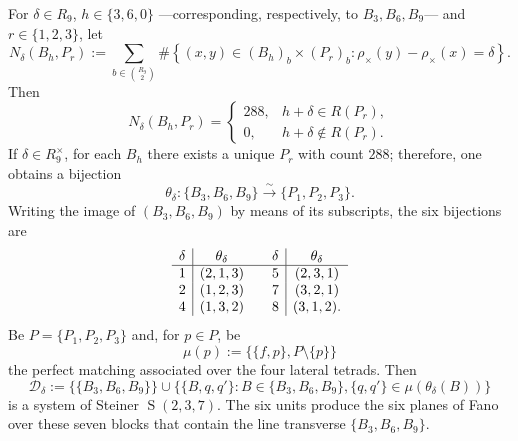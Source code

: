 \begin{theorem}
\label{thm:semillas-seis-fano-fase-rev3}
For \(\delta\in R_9\), \(h\in\{3,6,0\}\) ---corresponding,
respectively, to \(B_3,B_6,B_9\)--- and \(r\in\{1,2,3\}\), let
\begin{equation}
 N_\delta(B_h,P_r)
 :=\sum_{b\in\binom{R_9}{2}}
 \#\left\{(x,y)\in(B_h)_b\times(P_r)_b:
 \rho_\times(y)-\rho_\times(x)=\delta\right\}.
 \label{eq:conteo-incidencia-fano-semillas-rev3}
\end{equation}
Then
\begin{equation}
 N_\delta(B_h,P_r)=
 \begin{cases}
 288,&h+\delta\in R(P_r),\\
 0,&h+\delta\notin R(P_r).
 \end{cases}
 \label{eq:conteo-288-cero-fano-semillas-rev3}
\end{equation}
If \(\delta\in R_9^\times\), for each \(B_h\) there exists a unique \(P_r\)
with count \(288\); therefore, one obtains a bijection
\[
 \theta_\delta:\{B_3,B_6,B_9\}
 \xrightarrow{\sim}\{P_1,P_2,P_3\}.
\]
Writing the image of \((B_3,B_6,B_9)\) by means of its subscripts, the six
bijections are
\begin{equation}
 \begin{array}{c|c@{\qquad}c|c}
 \delta&\theta_\delta&\delta&\theta_\delta\\
 \hline
 1&(2,1,3)&5&(2,3,1)\\
 2&(1,2,3)&7&(3,2,1)\\
 4&(1,3,2)&8&(3,1,2).
 \end{array}
 \label{eq:tabla-theta-delta-fano-semillas-rev3}
\end{equation}
Be \(P=\{P_1,P_2,P_3\}\) and, for \(p\in P\), be
\[
 \mu(p):=\bigl\{\{f,p\},P\setminus\{p\}\bigr\}
\]
the perfect matching associated over the four lateral tetrads.
Then
\begin{equation}
 \mathcal D_\delta
 :=\bigl\{\{B_3,B_6,B_9\}\bigr\}
 \cup
 \bigl\{\{B,q,q'\}:B\in\{B_3,B_6,B_9\},
       \{q,q'\}\in\mu(\theta_\delta(B))\bigr\}
 \label{eq:sistema-fano-semillas-rev3}
\end{equation}
is a system of Steiner \(\operatorname{S}(2,3,7)\). The six units
produce the six planes of Fano over these seven blocks that contain the
line transverse \(\{B_3,B_6,B_9\}\).
\end{theorem}


